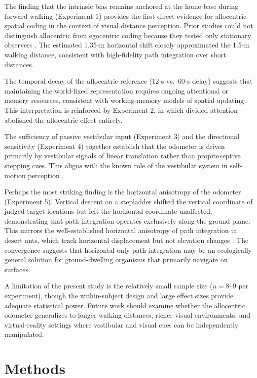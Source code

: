 \documentclass[11pt]{article}
\begin{document}
The finding that the intrinsic bias remains anchored at the home base during forward walking (Experiment 1) provides the first direct evidence for allocentric spatial coding in the context of visual distance perception. Prior studies could not distinguish allocentric from egocentric coding because they tested only stationary observers \citep{ooi2006, philbeck1997}. The estimated 1.35-m horizontal shift closely approximated the 1.5-m walking distance, consistent with high-fidelity path integration over short distances.

The temporal decay of the allocentric reference (12-s vs.\ 60-s delay) suggests that maintaining the world-fixed representation requires ongoing attentional or memory resources, consistent with working-memory models of spatial updating \citep{klatzky1998}. This interpretation is reinforced by Experiment 2, in which divided attention abolished the allocentric effect entirely.

The sufficiency of passive vestibular input (Experiment 3) and the directional sensitivity (Experiment 4) together establish that the odometer is driven primarily by vestibular signals of linear translation rather than proprioceptive stepping cues. This aligns with the known role of the vestibular system in self-motion perception \citep{angelaki2005, harris2002}.

Perhaps the most striking finding is the horizontal anisotropy of the odometer (Experiment 5). Vertical descent on a stepladder shifted the vertical coordinate of judged target locations but left the horizontal coordinate unaffected, demonstrating that path integration operates exclusively along the ground plane. This mirrors the well-established horizontal anisotropy of path integration in desert ants, which track horizontal displacement but not elevation changes \citep{wehner2003, wittlinger2006}. The convergence suggests that horizontal-only path integration may be an ecologically general solution for ground-dwelling organisms that primarily navigate on surfaces.

A limitation of the present study is the relatively small sample size ($n = 8$--$9$ per experiment), though the within-subject design and large effect sizes provide adequate statistical power. Future work should examine whether the allocentric odometer generalizes to longer walking distances, richer visual environments, and virtual-reality settings where vestibular and visual cues can be independently manipulated.

\section{Methods}
\end{document}
